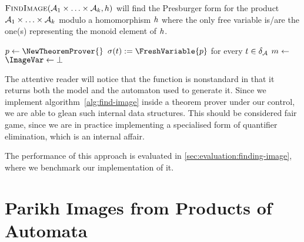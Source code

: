 \documentclass[acmsmall,review,anonymous,screen]{acmart}\settopmatter{printfolios=true,printccs=false,printacmref=true}
\theoremstyle{definition}
\begin{document}
  \begin{algorithm}
    \DontPrintSemicolon
    \caption{$\textsc{FindImage}{}(\mathcal{A}_1 \times \ldots \times \mathcal{A}_k, h)$ will find the Presburger form for the product $\mathcal{A}_1 \times \ldots \times \mathcal{A}_k$ modulo a homomorphism $h$ where the only free variable is/are the one(s) representing the monoid element of $h$.}\label{alg:find-image}
  
$p \gets \NewTheoremProver{}$\;
$\Filter(\Transition) := \FreshVariable{p}$ for every $t \in \delta_{\mathcal{A}}$\;
$m \gets$ \;
\;
$\ImageVar \gets \bot$\;
    \KwRet{\ImageVar}
    \end{algorithm}

    The attentive reader will notice that the \GetModel{} function is
    nonstandard in that it returns both the model and the automaton used to
    generate it. Since we implement algorithm~\ref{alg:find-image} inside a theorem
    prover under our control, we are able to glean such internal data structures. This should be considered fair game, since we are in practice implementing a specialised form of quantifier elimination, which is an internal affair.
    
    The performance of this approach is evaluated in
    \cref{sec:evaluation:finding-image}, where we benchmark our implementation
    of it.

\section{Parikh Images from Products of Automata}\label{sec:multiple}
\end{document}
